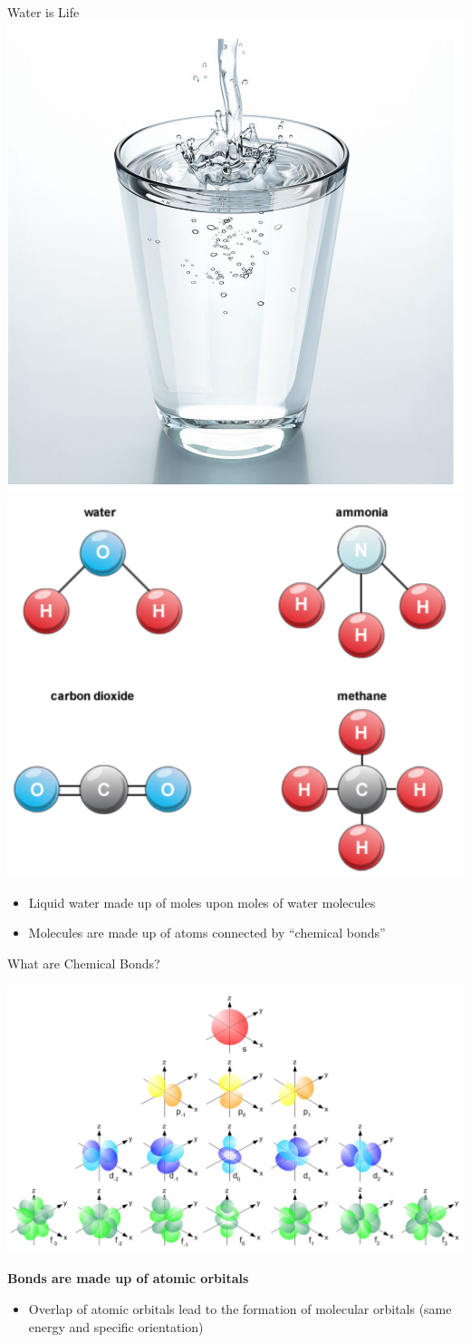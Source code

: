 \documentclass[11pt]{beamer}
\begin{document}
\begin{frame}{Water is Life}
  \centering
  \includegraphics[width=0.4\linewidth]{water}
  \includegraphics[width=0.4\linewidth,trim={0 6in 7in 0},clip]{molec_example}

  \begin{itemize}
  \item Liquid water made up of moles upon moles of water molecules
  \item Molecules are made up of atoms connected by ``chemical bonds''
  \end{itemize}
\end{frame}

\begin{frame}{What are Chemical Bonds?}
  \begin{center}
    \includegraphics[width=0.8\linewidth]{single_elect_orb}
  \end{center}
  \textbf{Bonds are made up of atomic orbitals}
  \begin{itemize}
  \item Overlap of atomic orbitals lead to the formation of molecular
    orbitals (same energy and specific orientation)
  \end{itemize}
\end{frame}
\end{document}
